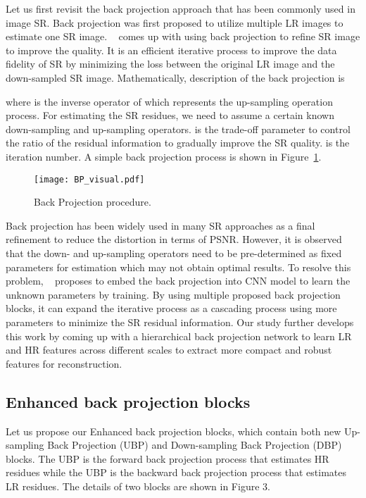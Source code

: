 \documentclass[10pt,twocolumn,letterpaper]{article}
\begin{document}
Let us first revisit the back projection approach that has been commonly used in image SR. Back projection was first proposed to utilize multiple LR images to estimate one SR image. ~\cite{DBPN} comes up with using back projection to refine SR image to improve the quality. It is an efficient iterative process to improve the data fidelity of SR by minimizing the loss between the original LR image and the down-sampled SR image. Mathematically, description of the back projection is
\begin{small}

\end{small}
where  is the inverse operator of  which represents the up-sampling operation process. For estimating the SR residues, we need to assume a certain known down-sampling and up-sampling operators.  is the trade-off parameter to control the ratio of the residual information to gradually improve the SR quality.  is the iteration number. A simple back projection process is shown in Figure~\ref{Figure 2}.
\begin{figure}[t]
\vskip 0.01in
\begin{center}
\centerline{\texttt{[image: BP\_visual.pdf]}}
\caption{Back Projection procedure.}
\label{Figure 2}
\end{center}
\vskip -0.3in
\end{figure}
Back projection has been widely used in many SR approaches as a final refinement to reduce the distortion in terms of PSNR. However, it is observed that the down- and up-sampling operators need to be pre-determined as fixed parameters for estimation which may not obtain optimal results. To resolve this problem, ~\cite{DBPN} proposes to embed the back projection into CNN model to learn the unknown parameters by training. By using multiple proposed back projection blocks, it can expand the iterative process as a cascading process using more parameters to minimize the SR residual information. Our study further develops this work by coming up with a hierarchical back projection network to learn LR and HR features across different scales to extract more compact and robust features for reconstruction.

\subsection{Enhanced back projection blocks}
Let us propose our Enhanced back projection blocks, which contain both new Up-sampling Back Projection (UBP) and Down-sampling Back Projection (DBP) blocks. The UBP is the forward back projection process that estimates HR residues while the UBP is the backward back projection process that estimates LR residues. The details of two blocks are shown in Figure 3. 
\end{document}
